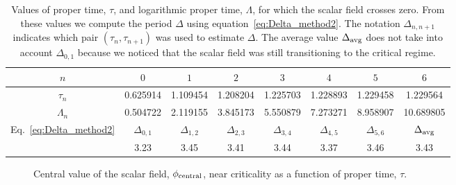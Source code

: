 \documentclass[a4paper,11pt]{article}
\newcommand{\D}{\Delta}
\newcommand{\lrpar}[1]{\left( #1 \right)}
\begin{document}
\begin{table}[ht]
  \centering
  \begin{tabular}{c|ccccccc}
    \hline
    \hline
    $n$ & $0$ & $1$ & $2$ & $3$ & $4$ & $5$ & $6$\\
    \hline
    $\tau_{n}$ & 0.625914 & 1.109454 & 1.208204 & 1.225703 & 1.228893 & 1.229458 & 1.229564\\
    $\Lambda_{n}$ & 0.504722 & 2.119155 & 3.845173 & 5.550879 & 7.273271 & 8.958907 & 10.689805\\
    \hline
    \hline
    \multirow{2}{*}{Eq.~\eqref{eq:Delta_method2}} & $\D_{0,1}$ & $\D_{1,2}$ & $\D_{2,3}$ & $\D_{3,4}$ & $\D_{4,5}$ & $\D_{5,6}$ & $\D_{\rm avg}$\\
    \cline{2-8}
    & 3.23 & 3.45 & 3.41 & 3.44 & 3.37 & 3.46 & 3.43\\
    \hline
    \hline
  \end{tabular}
  \caption[Values of proper time and logarithmic proper time used to estimate the universal oscillation period $\D$.]{Values of proper time, $\tau$, and logarithmic proper time, $\Lambda$, for which the scalar field crosses zero. From these values we compute the period $\Delta$ using equation~\eqref{eq:Delta_method2}. The notation $\Delta_{n,n+1}$ indicates which pair $\lrpar{\tau_{n},\tau_{n+1}}$ was used to estimate $\Delta$. The average value $\D_{\rm avg}$ does not take into account $\D_{0,1}$ because we noticed that the scalar field was still transitioning to the critical regime.}
  \label{tab:accumulation_time}
\end{table}

\begin{figure}[ht]
  \centering
  
  \caption[Central value of the scalar field, $\phi_{\rm central}$, near criticality as a function of proper time, $\tau$.]{Central value of the scalar field, $\phi_{\rm central}$, near criticality as a function of proper time, $\tau$.}
  \label{fig:accumulation_tau}
\end{figure}
\end{document}
